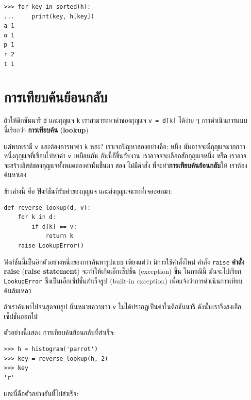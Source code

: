 \begin{verbatim}
>>> for key in sorted(h):
...     print(key, h[key])
a 1
o 1
p 1
r 2
t 1
\end{verbatim}



\section{การเทียบค้นย้อนกลับ}
\label{raise}

ถ้าให้ดิกชันนารี \texttt{d} และกุญแจ \texttt{k}
เราสามารถหาค่าของกุญแจ \texttt{v = d[k]} ได้ง่าย ๆ
การดำเนินการแบบนี้เรียกว่า \textbf{การเทียบค้น} (\textbf{lookup})

แต่หากเรามี \texttt{v} และต้องการหาค่า \texttt{k} หละ?
เราเจอปัญหาสองอย่างคือ: หนึ่ง มันอาจจะมีกุญแจมากกว่าหนึ่งกุญแจที่เชื่อมไปหาค่า \texttt{v} เหมือนกัน
อันนี้ก็ขึ้นกับงาน เราอาจจจะเลือกสักกุญแจหนึ่ง 
หรือ เราอาจจะสร้างลิสต์ของกุญแจทั้งหมดของค่านั้นขึ้นมา
สอง ไม่มีคำสั่ง ที่จะทำ\textbf{การเทียบค้นย้อนกลับ}ให้
เราต้องค้นหาเอง

ข้างล่างนี้ คือ ฟังก์ชันที่รับค่าของกุญแจ
และส่งกุญแจแรกที่เจอออกมา:

\begin{verbatim}
def reverse_lookup(d, v):
    for k in d:
        if d[k] == v:
            return k
    raise LookupError()
\end{verbatim}
%
ฟังก์ชันนี้เป็นอีกตัวอย่างหนึ่งของการค้นหารูปแบบ
เพียงแต่ว่า มีการใช้คำสั่งใหม่ คำสั่ง \texttt{raise}
\textbf{คำสั่ง raise} (\textbf{raise statement}) จะทำให้เกิดเอ็กเซ็ปชั่น (exception) ขึ้น
ในกรณีนี้ มันจะไปเรียก \texttt{LookupError} ซึ่งเป็นเอ็กเซ็ปชั่นสำเร็จรูป (built-in exception) เพื่อแจ้งว่าการดำเนินการเทียบค้นล้มเหลว
  

ถ้าเราค้นหาไปจนสุดจบลูป นั่นหมายความว่า \texttt{v} ไม่ได้ปรากฏเป็นค่าในดิกชันนารี
ดังนั้นเราจึงส่งเอ็กเซ็ปชั่นออกไป


ตัวอย่างนี้แสดง การเทียบค้นย้อนกลับที่สำเร็จ:

\begin{verbatim}
>>> h = histogram('parrot')
>>> key = reverse_lookup(h, 2)
>>> key
'r'
\end{verbatim}
%
และนี่คือตัวอย่างอันที่ไม่สำเร็จ:

